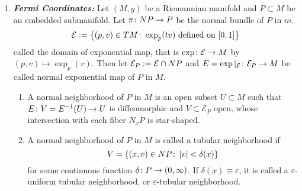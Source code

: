\begin{enumerate}[label=\arabic{*}.]
\begin{proof}
\begin{equation*}
	    \end{equation*}
	    On the other hand, suppose $\alpha(t) \in M \backslash U$ for some $t$. The triangle inequality implies, 
	    \begin{equation*}
	        B_{\varepsilon_p}(x) \subset B_{2 \varepsilon_p}(p) \subset U
	    \end{equation*}
	    so there is a first time $b_0 \in[a, b]$ such that $d\left(x, \alpha\left(b_0\right)\right) \geq \varepsilon_p$. Then
	    \begin{equation*}
	        \op{Leng}(\alpha) \geq \op{Leng}\left(\left.\alpha\right|_{\left[a, b_0\right]}\right) \geq \varepsilon_p>c
	    \end{equation*}
	    Taken together, these two inequalities show that $\op{Leng}(\alpha) \geq c$ for every such $\alpha$, which implies $d(x, S) \geq c$.
	\end{proof}
	\begin{cor}
	    Let $(M, g)$ be a Riemannian manifold, and let $f$ be a smooth local distance function on an open subset $U \subseteq M$. If c is a real number such that $S=f^{-1}(c)$ is nonempty, then there is a neighborhood $U_0$ of $S$ in $U$ on which $|f(x)-c|$ is equal to the distance in $M$ from $x$ to $S$.
	\end{cor}

	\item \emph{\textbf{Fermi Coordinates:}} Let $(M,g)$ be a Riemannian manifold and $P \subset M$ be an embedded submanifold. Let $\pi \colon NP \rightarrow P$ be the normal bundle of $P$ in $m$.
	\begin{equation*}
	    \mathcal{E} \vcentcolon= \left\{(p,v) \in TM \colon \exp_p(tv) \text{ defined on }[0,1]\right\}
	\end{equation*}
	called the domain of exponential map, that is $\exp \colon \mathcal{E} \rightarrow M$ by $(p,v) \mapsto \exp_p(v)$. Then let $\mathcal{E}_P \vcentcolon= \mathcal{E} \cap NP$ and $E = \exp|_\mathcal{E} \colon \mathcal{E}_P \rightarrow M$ be called normal exponential map of $P$ in $M$. 
	\begin{defn}
	    \begin{enumerate}[label=(\arabic{*})]
	    	\item A normal neighborhood of $P$ in $M$ is an open subset $U \subset M$ such that $E \colon V=E^{-1}(U) \rightarrow U$ is diffeomorphic and $V \subset \mathcal{E}_P$ open, whose intersection with each fiber $N_xP$ is star-shaped.

	    	\item  A normal neighborhood of $P$ in $M$ is called a tubular neighborhood if 
	    	\begin{equation*}
	    	    V = \left\{(x,v) \in NP \colon \left\lvert v\right\lvert < \delta(x)\right\}
	    	\end{equation*}
	    	for some continuous function $\delta \colon P \rightarrow (0,\infty)$. If $\delta(x) \equiv \varepsilon$, it is called a $\varepsilon$-uniform tubular neighborhood, or $\varepsilon$-tubular neighborhood.
	    \end{enumerate}
	\end{defn}


\end{enumerate}
